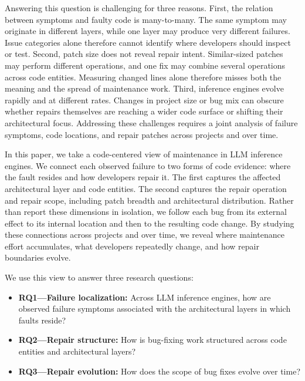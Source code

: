 Answering this question is challenging for three reasons. First, the relation between symptoms and faulty code is many-to-many. The same symptom may originate in different layers, while one layer may produce very different failures. Issue categories alone therefore cannot identify where developers should inspect or test. Second, patch size does not reveal repair intent. Similar-sized patches may perform different operations, and one fix may combine several operations across code entities. Measuring changed lines alone therefore misses both the meaning and the spread of maintenance work. Third, inference engines evolve rapidly and at different rates. Changes in project size or bug mix can obscure whether repairs themselves are reaching a wider code surface or shifting their architectural focus. Addressing these challenges requires a joint analysis of failure symptoms, code locations, and repair patches across projects and over time.

In this paper, we take a code-centered view of maintenance in LLM inference engines. We connect each observed failure to two forms of code evidence: where the fault resides and how developers repair it. The first captures the affected architectural layer and code entities. The second captures the repair operation and repair scope, including patch breadth and architectural distribution. Rather than report these dimensions in isolation, we follow each bug from its external effect to its internal location and then to the resulting code change. By studying these connections across projects and over time, we reveal where maintenance effort accumulates, what developers repeatedly change, and how repair boundaries evolve.

We use this view to answer three research questions:
\begin{itemize}
    \item \textbf{RQ1---Failure localization:} Across LLM inference engines, how are observed failure symptoms associated with the architectural layers in which faults reside?
    \item \textbf{RQ2---Repair structure:} How is bug-fixing work structured across code entities and architectural layers?
    \item \textbf{RQ3---Repair evolution:} How does the scope of bug fixes evolve over time?
\end{itemize}

